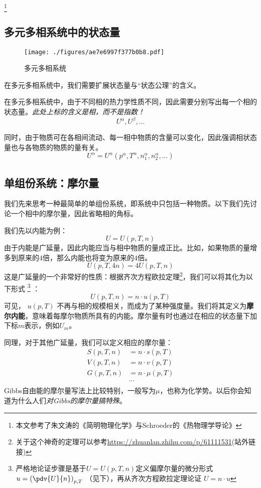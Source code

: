 
\begin{issues}
\issueDraft
\end{issues}

\footnote{本文参考了朱文涛的《简明物理化学》与Schroeder的《热物理学导论》}

\subsection{多元多相系统中的状态量}
\begin{figure}[ht]
\centering
\texttt{[image: ./figures/ae7e6997f377b0b8.pdf]}
\caption{多元多相系统} \label{fig_ParMol_1}
\end{figure}

在多元多相系统中，我们需要扩展状态量与“状态公理”的含义。

在多元多相系统中，由于不同相的热力学性质不同，因此需要分别写出每一个相的状态量。\textsl{此处上标的含义是相，而不是指数！}
$$U^\alpha, U^\beta,...$$

同时，由于物质可在各相间流动、每一相中物质的含量可以变化，因此强调相状态量也与各物质的物质的量有关。
$$U^\alpha = U^\alpha (p^\alpha, T^\alpha, n_1^\alpha,n_2^\alpha,...)$$

\subsection{单组份系统：摩尔量}
我们先来思考一种最简单的单组份系统，即系统中只包括一种物质。以下我们先讨论一个相中的摩尔量，因此省略相的角标。

我们先以内能为例：
$$U = U (p, T, n)$$
由于内能是广延量，因此内能应当与相中物质的量成正比。比如，如果物质的量增多到原来的$4$倍，那么内能也将变为原来的$4$倍。
$$U(p, T, 4 n) = 4 U (p, T, n)$$
这是广延量的一个非常好的性质：根据齐次方程欧拉定理\footnote{关于这个神奇的定理可以参考\href{https://zhuanlan.zhihu.com/p/61111531}{https://zhuanlan.zhihu.com/p/61111531}(站外链接)}，我们可以将其化为以下形式
\footnote{严格地论证步骤是基于$U=U(p,T,n)$定义偏摩尔量的微分形式$u = \left( \pdv{U}{n} \right)_{p,T}$ （见下），再从齐次方程欧拉定理论证 $U = n \cdot u $}
：
$$U(p, T, n) = n \cdot u (p, T)$$
可见， $u (p, T)$ 不再与相的规模相关，而成为了某种强度量。我们将其定义为\textbf{摩尔内能}，意味着每摩尔物质所具有的内能。摩尔量有时也通过在相应的状态量下加下标$m$表示，例如$U_m$。

同理，对于其他广延量，我们可以定义相应的摩尔量：
$$
\begin{aligned}
S(p, T, n) &= n \cdot s (p, T)\\
V(p, T, n) &= n \cdot v (p, T)\\
G(p, T, n) &= n \cdot \mu (p, T)\\
&...\\
\end{aligned}
$$
Gibbs自由能的摩尔量写法上比较特别，一般写为$\mu$，也称为化学势。以后你会知道为什么人们\textsl{对Gibbs的摩尔量搞特殊}。

